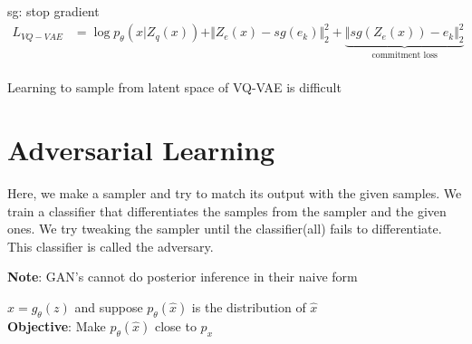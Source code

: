 \documentclass[11pt]{article}
\begin{document}
sg: stop gradient
\begin{align*}
  L_{VQ-VAE} &= \log p_{\theta}\left(x | Z_q(x)\right) + \Vert Z_e(x) - sg(e_k) \Vert^2_2
               + \underbrace{\Vert sg(Z_e(x)) - e_k \Vert_2^2}_{\text{commitment loss}}\\
\end{align*}

Learning to sample from latent space of VQ-VAE is difficult

\section{Adversarial Learning}
\label{sec:adversarial-learning}

Here, we make a sampler and try to match its output with the given samples. We train a classifier that differentiates the samples from the sampler and the given ones. We try tweaking the sampler until the classifier(all) fails to differentiate. This classifier is called the adversary.

\textbf{Note}: GAN's cannot do posterior inference in their naive form

\vspace{1em}
$\hat{x} = g_{\theta}(z)$ and suppose $p_{\theta}(\hat{x})$ is the distribution of $\hat{x}$ \\
\textbf{Objective}: Make $p_{\theta}(\hat{x})$ close to $p_x$

\end{document}
